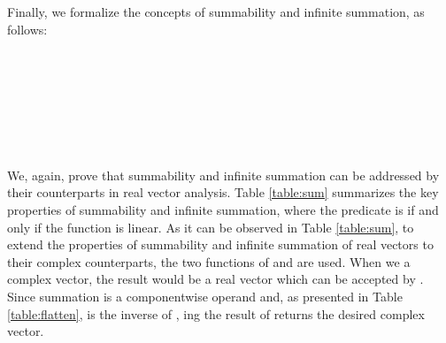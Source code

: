 \documentclass{llncs}
\begin{document}
{		


Finally, we formalize the concepts of summability and infinite summation, as follows: 
\begin{definition} \vspace{.2cm}\\
 \\
 \\
  \vspace{.1cm}\\
 \\
  \\
\end{definition}

We, again, prove that summability and infinite summation can be addressed by their counterparts in real vector analysis. 
Table \ref{table:sum} summarizes the key properties of summability and infinite summation, where the predicate  is  if and only if the function  is linear. As it can be observed in Table \ref{table:sum}, to extend the properties of summability and infinite summation of real vectors to their complex counterparts, the two functions of  and  are used. When we  a complex vector, the result would be a real vector which can be accepted by . Since summation is a componentwise operand and, as presented in Table \ref{table:flatten},   is the inverse of  , ing the result of  returns the desired complex vector.

}
\end{document}
